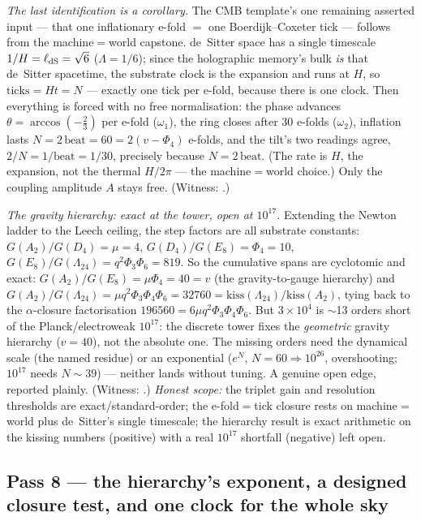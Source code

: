 \documentclass[11pt]{article}
\begin{document}
\emph{The last identification is a corollary.} The CMB template's one remaining asserted
input --- that one inflationary e-fold $=$ one Boerdijk--Coxeter tick --- follows from the
machine$=$world capstone. de~Sitter space has a single timescale $1/H=\ell_{\rm dS}=
\sqrt6$ ($\Lambda=1/6$); since the holographic memory's bulk \emph{is} that de~Sitter
spacetime, the substrate clock is the expansion and runs at $H$, so $\mathrm{ticks}=Ht=N$
--- exactly one tick per e-fold, because there is one clock. Then everything is forced
with no free normalisation: the phase advances $\theta=\arccos(-\tfrac23)$ per e-fold
($\omega_1$), the ring closes after $30$ e-folds ($\omega_2$), inflation lasts $N=2\,
\mathrm{beat}=60=2(v-\Phi_4)$ e-folds, and the tilt's two readings agree, $2/N=1/\mathrm{
beat}=1/30$, precisely because $N=2\,\mathrm{beat}$. (The rate is $H$, the expansion, not
the thermal $H/2\pi$ --- the machine$=$world choice.) Only the coupling amplitude $A$ stays
free. (Witness: .)

\emph{The gravity hierarchy: exact at the tower, open at $10^{17}$.} Extending the Newton
ladder to the Leech ceiling, the step factors are all substrate constants:
$G(A_2)/G(D_4)=\mu=4$, $G(D_4)/G(E_8)=\Phi_4=10$, $G(E_8)/G(\Lambda_{24})=q^2\Phi_3\Phi_6
=819$. So the cumulative spans are cyclotomic and exact: $G(A_2)/G(E_8)=\mu\Phi_4=40=v$
(the gravity-to-gauge hierarchy) and $G(A_2)/G(\Lambda_{24})=\mu q^2\Phi_3\Phi_4\Phi_6=
32760=\mathrm{kiss}(\Lambda_{24})/\mathrm{kiss}(A_2)$, tying back to the $\alpha$-closure
factorisation $196560=6\mu q^2\Phi_3\Phi_4\Phi_6$. But $3\times10^4$ is $\sim$13 orders
short of the Planck/electroweak $10^{17}$: the discrete tower fixes the \emph{geometric}
gravity hierarchy ($v=40$), not the absolute one. The missing orders need the dynamical
scale (the named residue) or an exponential ($e^{N}$, $N=60\Rightarrow10^{26}$,
overshooting; $10^{17}$ needs $N\sim39$) --- neither lands without tuning. A genuine open
edge, reported plainly. (Witness: .)
\emph{Honest scope:} the triplet gain and resolution thresholds are exact/standard-order;
the e-fold$=$tick closure rests on machine$=$world plus de~Sitter's single timescale; the
hierarchy result is exact arithmetic on the kissing numbers (positive) with a real
$10^{17}$ shortfall (negative) left open.

\subsection{Pass 8 --- the hierarchy's exponent, a designed closure test, and one clock for the whole sky}
\label{sec:capstone-eight}
\end{document}
